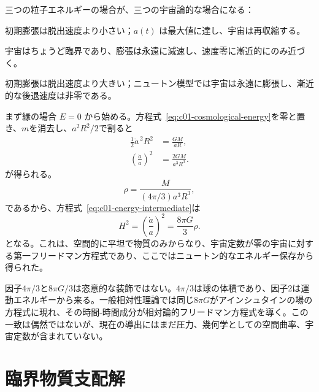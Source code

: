 三つの粒子エネルギーの場合が、三つの宇宙論的な場合になる：
\begin{description}[style=nextline]
\item[\(E<0\)：] 初期膨張は脱出速度より小さい；\(a(t)\) は最大値に達し、宇宙は再収縮する。
\item[\(E=0\)：] 宇宙はちょうど臨界であり、膨張は永遠に減速し、速度零に漸近的にのみ近づく。
\item[\(E>0\)：] 初期膨張は脱出速度より大きい；ニュートン模型では宇宙は永遠に膨張し、漸近的な後退速度は非零である。
\end{description}

まず縁の場合 \(E=0\) から始める。方程式~\eqref{eq:c01-cosmological-energy}を零と置き、\(m\)を消去し、\(a^2R^2/2\)で割ると
\begin{align}
\frac12\dot a^{\,2}R^2&=\frac{GM}{aR}, \\
\left(\frac{\dot a}{a}\right)^2&=\frac{2GM}{a^3R^3}.
\label{eq:c01-energy-intermediate}
\end{align}
が得られる。
\begin{equation}
\rho=\frac{M}{(4\pi/3)a^3R^3},
\end{equation}
であるから、方程式~\eqref{eq:c01-energy-intermediate}は
\begin{equation}
\boxed{
H^2=\left(\frac{\dot a}{a}\right)^2=\frac{8\pi G}{3}\rho.
}
\label{eq:c01-first-friedmann}
\end{equation}
となる。これは、空間的に平坦で物質のみからなり、宇宙定数が零の宇宙に対する第一フリードマン方程式であり、ここではニュートン的なエネルギー保存から得られた。

\begin{classroomqa}
\end{classroomqa}

因子\(4\pi/3\)と\(8\pi G/3\)は恣意的な装飾ではない。\(4\pi/3\)は球の体積であり、因子2は運動エネルギーから来る。一般相対性理論では同じ\(8\pi G\)がアインシュタインの場の方程式に現れ、その時間-時間成分が相対論的フリードマン方程式を導く。この一致は偶然ではないが、現在の導出にはまだ圧力、幾何学としての空間曲率、宇宙定数が含まれていない。

\section{臨界物質支配解}

